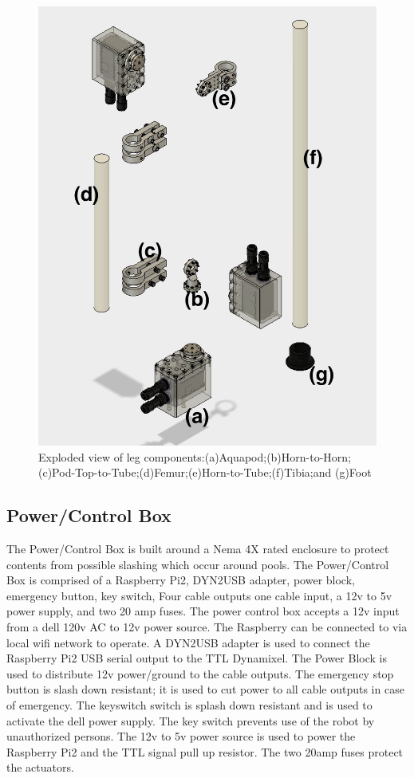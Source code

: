 \begin{figure}[h]
\centering
\includegraphics[width=1.0\columnwidth]{./img/aquaShoko-v3dot3-exploded-leg.png}
\caption{Exploded view of leg components:(a)Aquapod;(b)Horn-to-Horn;(c)Pod-Top-to-Tube;(d)Femur;(e)Horn-to-Tube;(f)Tibia;and (g)Foot}
\label{fig:leg exploded}
\end{figure}
 

\subsection{Power/Control Box}
The Power/Control Box is built around a Nema 4X rated enclosure to protect contents from possible slashing which occur around pools. The Power/Control Box is comprised of a Raspberry Pi2, DYN2USB adapter, power block, emergency button, key switch, Four cable outputs one cable input, a 12v to 5v power supply, and two 20 amp fuses. The power control box accepts a 12v input from a dell 120v AC to 12v power source.
The Raspberry can be connected to via local wifi network to operate. 
A DYN2USB adapter is used to connect the Raspberry Pi2 USB serial output to the TTL Dynamixel. 
The Power Block is used to distribute 12v power/ground to the cable outputs.
The emergency stop button is slash down resistant; it is used to cut power to all cable outputs in case of emergency.
The keyswitch switch is splash down resistant and is used to activate the dell power supply. The key switch prevents use of the robot by unauthorized persons. The 12v to 5v power source is used to power the Raspberry Pi2 and the TTL signal pull up resistor.
The two 20amp fuses protect the actuators.



